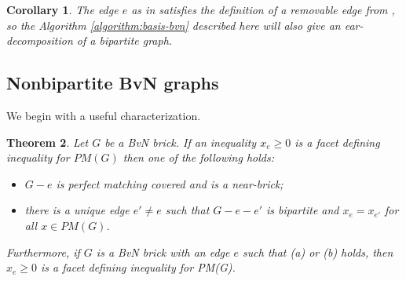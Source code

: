 \documentclass[11pt]{article}
\newcommand{\1}{\mathbf{1}}
\newcommand{\0}{\mathbf{0}}
\newtheorem{theorem}{Theorem}[section]
\newtheorem{CO}[theorem]{Corollary}
\begin{document}
\begin{CO}
    The edge $e$ as in  satisfies the definition of a removable edge from , so the Algorithm \ref{algorithm:basis-bvn} described here will also give an ear-decomposition of a bipartite graph.
\end{CO}

\subsection{Nonbipartite BvN graphs}

We begin with a useful characterization. \begin{theorem}\label{thm:facet-nonbip}
    Let $G$ be a BvN brick. If an inequality $x_e\geq 0$ is a facet defining inequality for $PM(G)$ then one of the following holds: \begin{itemize}
        \item[(a)] $G-e$ is perfect matching covered and is a near-brick;
        \item[(b)] there is a unique edge $e'\neq e$ such that $G-e-e'$ is bipartite and $x_e = x_{e'}$ for all $x \in PM(G)$.
    \end{itemize}
    Furthermore, if $G$ is a BvN brick with an edge $e$ such that (a) or (b) holds, then $x_e\geq 0$ is a facet defining inequality for PM(G).
\end{theorem}
\end{document}
